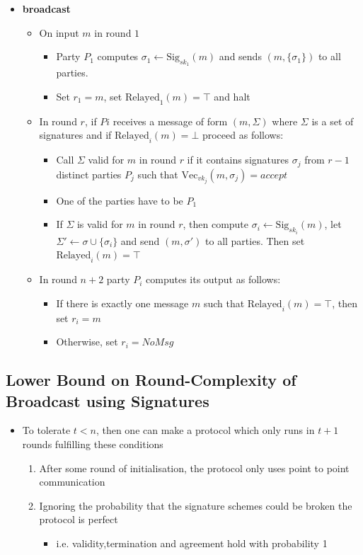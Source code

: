 \documentclass[11pt]{article}
\begin{document}
\begin{itemize}
\item \textbf{broadcast}
\begin{itemize}
\item On input \(m\) in round \(1\)
\begin{itemize}
\item Party \(P_1\) computes \(\sigma_1 \leftarrow \text{Sig}_{sk_1}(m)\) and sends \((m, \{\sigma_1\})\) to all parties.
\item Set \(r_1=m\), set \(\text{Relayed}_1(m) = \top\) and halt
\end{itemize}
\item In round \(r\), if \(Pi\) receives a message of form \((m, \Sigma)\) where \(\Sigma\) is a set of signatures and if \(\text{Relayed}_i(m)=\bot\) proceed as follows:
\begin{itemize}
\item Call \(\Sigma\) valid for \(m\) in round \(r\) if it contains signatures \(\sigma_j\) from \(r-1\) distinct parties \(P_j\) such that \(\text{Vec}_{vk_j}(m,\sigma_j) = accept\)
\item One of the parties have to be \(P_1\)
\item If \(\Sigma\) is valid for \(m\) in round \(r\), then compute \(\sigma_i \leftarrow \text{Sig}_{sk_i}(m)\), let \(\Sigma' \leftarrow \sigma \cup \{\sigma_i\}\)  and send \((m,\sigma')\) to all parties. Then set \(\text{Relayed}_i(m)= \top\)
\end{itemize}
\item In round \(n+2\) party \(P_i\) computes its output as follows:
\begin{itemize}
\item If there is exactly one message \(m\) such that \(\text{Relayed}_i(m) = \top\), then set \(r_i = m\)
\item Otherwise, set \(r_i = NoMsg\)
\end{itemize}
\end{itemize}
\end{itemize}

\subsection{Lower Bound on Round-Complexity of Broadcast using Signatures}
\label{sec:org2c99f01}
\begin{itemize}
\item To tolerate \(t<n\), then one can make a protocol which only runs in \(t+1\) rounds fulfilling these conditions
\begin{enumerate}
\item After some round of initialisation, the protocol only uses point to point communication
\item Ignoring the probability that the signature schemes could be broken the protocol is perfect
\begin{itemize}
\item i.e. validity,termination and agreement hold with probability 1
\end{itemize}
\end{enumerate}
\end{itemize}
\end{document}
